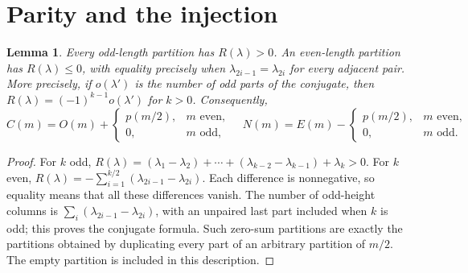 \documentclass[11pt]{article}
\newtheorem{lemma}[theorem]{Lemma}
\begin{document}
\section{Parity and the injection}
\begin{lemma}\label{lem:sign}
Every odd-length partition has $R(\lambda)>0$.
An even-length partition has $R(\lambda)\le0$, with equality precisely
when $\lambda_{2i-1}=\lambda_{2i}$ for every adjacent pair.
More precisely, if $o(\lambda')$ is the number of odd parts of the
conjugate, then $R(\lambda)=(-1)^{k-1}o(\lambda')$ for $k>0$.
Consequently,
\begin{equation}\label{eq:counts}
 C(m)=O(m)+\begin{cases}p(m/2),&m\text{ even},\\0,&m\text{ odd},\end{cases}
 \quad
 N(m)=E(m)-\begin{cases}p(m/2),&m\text{ even},\\0,&m\text{ odd}.
 \end{cases}
\end{equation}
\end{lemma}
\begin{proof}
For $k$ odd,
$R(\lambda)=(\lambda_1-\lambda_2)+\cdots+
(\lambda_{k-2}-\lambda_{k-1})+\lambda_k>0$.
For $k$ even,
$R(\lambda)=-\sum_{i=1}^{k/2}(\lambda_{2i-1}-\lambda_{2i})$.
Each difference is nonnegative, so equality means that all these
differences vanish. The number of odd-height columns is
$\sum_i(\lambda_{2i-1}-\lambda_{2i})$, with an unpaired last part
included when $k$ is odd; this proves the conjugate formula.
Such zero-sum partitions are exactly the partitions obtained
by duplicating every part of an arbitrary partition of $m/2$.
The empty partition is included in this description.
\end{proof}
\end{document}
